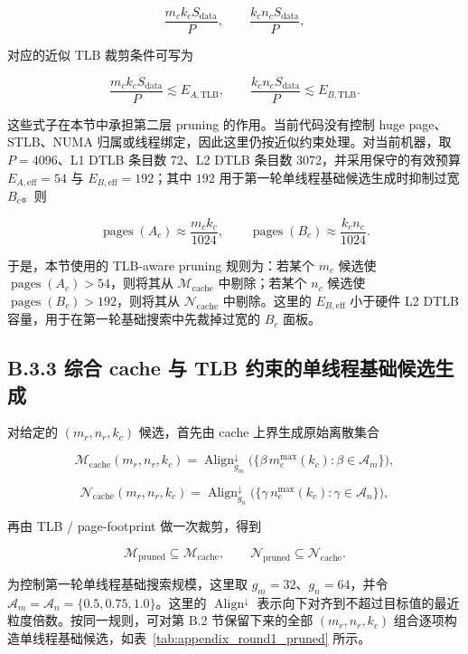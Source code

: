\documentclass[a4paper,11pt,oneside]{article}
\begin{document}
$$
\frac{m_c k_c S_{\text{data}}}{P},
\qquad
\frac{k_c n_c S_{\text{data}}}{P},
$$

对应的近似 TLB 裁剪条件可写为

$$
\frac{m_c k_c S_{\text{data}}}{P} \lesssim E_{A,\text{TLB}},
\qquad
\frac{k_c n_c S_{\text{data}}}{P} \lesssim E_{B,\text{TLB}}.
$$

这些式子在本节中承担第二层 pruning 的作用。当前代码没有控制 huge page、STLB、NUMA 归属或线程绑定，因此这里仍按近似约束处理。对当前机器，取 $P=4096$、L1 DTLB 条目数 72、L2 DTLB 条目数 3072，并采用保守的有效预算 $E_{A,\text{eff}}=54$ 与 $E_{B,\text{eff}}=192$；其中 $192$ 用于第一轮单线程基础候选生成时抑制过宽 $B_c$。则

$$
\operatorname{pages}(A_c) \approx \frac{m_c k_c}{1024},
\qquad
\operatorname{pages}(B_c) \approx \frac{k_c n_c}{1024}.
$$

于是，本节使用的 TLB-aware pruning 规则为：若某个 $m_c$ 候选使 $\operatorname{pages}(A_c) > 54$，则将其从 $\mathcal{M}_{\text{cache}}$ 中剔除；若某个 $n_c$ 候选使 $\operatorname{pages}(B_c) > 192$，则将其从 $\mathcal{N}_{\text{cache}}$ 中剔除。这里的 $E_{B,\text{eff}}$ 小于硬件 L2 DTLB 容量，用于在第一轮基础搜索中先裁掉过宽的 $B_c$ 面板。

\subsection*{B.3.3 综合 cache 与 TLB 约束的单线程基础候选生成}

对给定的 $(m_r,n_r,k_c)$ 候选，首先由 cache 上界生成原始离散集合

$$
\mathcal{M}_{\text{cache}}(m_r,n_r,k_c)
= \operatorname{Align}^{\downarrow}_{g_m}\bigl(\{\beta\, m_c^{\max}(k_c) : \beta \in \mathcal{A}_m\}\bigr),
$$

$$
\mathcal{N}_{\text{cache}}(m_r,n_r,k_c)
= \operatorname{Align}^{\downarrow}_{g_n}\bigl(\{\gamma\, n_c^{\max}(k_c) : \gamma \in \mathcal{A}_n\}\bigr),
$$

再由 TLB / page-footprint 做一次裁剪，得到

$$
\mathcal{M}_{\text{pruned}} \subseteq \mathcal{M}_{\text{cache}},
\qquad
\mathcal{N}_{\text{pruned}} \subseteq \mathcal{N}_{\text{cache}}.
$$

为控制第一轮单线程基础搜索规模，这里取 $g_m=32$、$g_n=64$，并令 $\mathcal{A}_m=\mathcal{A}_n=\{0.5,0.75,1.0\}$。这里的 $\operatorname{Align}^{\downarrow}$ 表示向下对齐到不超过目标值的最近粒度倍数。按同一规则，可对第 B.2 节保留下来的全部 $(m_r,n_r,k_c)$ 组合逐项构造单线程基础候选，如表~\ref{tab:appendix_round1_pruned} 所示。
\end{document}
